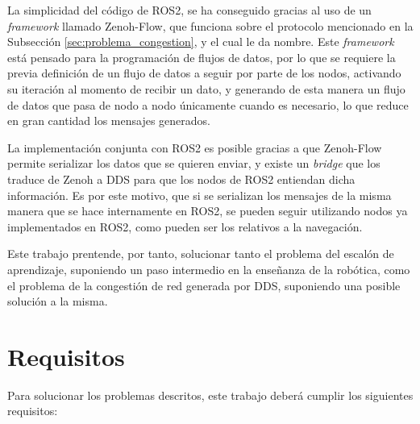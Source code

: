 La simplicidad del código de ROS2, se ha conseguido gracias al uso de un
\textit{framework} llamado Zenoh-Flow, que funciona sobre el protocolo
mencionado en la Subsección \ref{sec:problema_congestion}, y el cual le da
nombre.
Este \textit{framework} está pensado para la programación de flujos de datos,
por lo que se requiere la previa definición de un flujo de datos a seguir por
parte de los nodos, activando su iteración al momento de recibir un dato, y
generando de esta manera un flujo de datos que pasa de nodo a nodo únicamente
cuando es necesario, lo que reduce en gran cantidad los mensajes generados.

La implementación conjunta con ROS2 es posible gracias a que Zenoh-Flow permite
serializar los datos que se quieren enviar, y existe un \textit{bridge} que los
traduce de Zenoh a DDS para que los nodos de ROS2 entiendan dicha información.
Es por este motivo, que si se serializan los mensajes de la misma manera que se
hace internamente en ROS2, se pueden seguir utilizando nodos ya implementados en
ROS2, como pueden ser los relativos a la navegación.

Este trabajo prentende, por tanto, solucionar tanto el problema del escalón de
aprendizaje, suponiendo un paso intermedio en la enseñanza de la robótica, como
el problema de la congestión de red generada por DDS, suponiendo una posible
solución a la misma.


\section{Requisitos}
\label{sec:requisitos}

Para solucionar los problemas descritos, este trabajo deberá cumplir los
siguientes requisitos:

